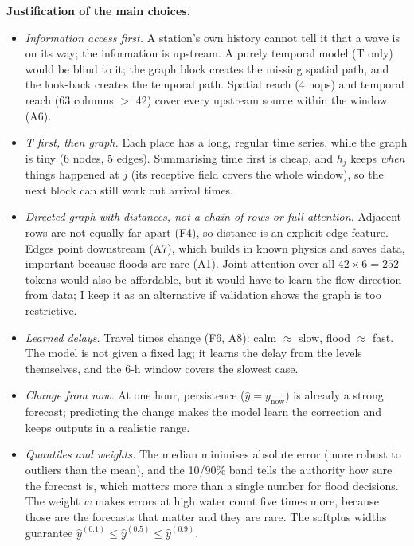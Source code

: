 \textbf{Justification of the main choices.}
\begin{itemize}
\item \emph{Information access first.} A station's own history cannot tell it that a wave is on its way; the information is upstream. A purely temporal model (T only) would be blind to it; the graph block creates the missing spatial path, and the look-back creates the temporal path. Spatial reach (4 hops) and temporal reach (63 columns $>$ 42) cover every upstream source within the window (A6).
\item \emph{T first, then graph.} Each place has a long, regular time series, while the graph is tiny (6 nodes, 5 edges). Summarising time first is cheap, and $h_j$ keeps \emph{when} things happened at $j$ (its receptive field covers the whole window), so the next block can still work out arrival times.
\item \emph{Directed graph with distances, not a chain of rows or full attention.} Adjacent rows are not equally far apart (F4), so distance is an explicit edge feature. Edges point downstream (A7), which builds in known physics and saves data, important because floods are rare (A1). Joint attention over all $42\times6=252$ tokens would also be affordable, but it would have to learn the flow direction from data; I keep it as an alternative if validation shows the graph is too restrictive.
\item \emph{Learned delays.} Travel times change (F6, A8): calm $\approx$ slow, flood $\approx$ fast. The model is not given a fixed lag; it learns the delay from the levels themselves, and the 6-h window covers the slowest case.
\item \emph{Change from now.} At one hour, persistence ($\hat y=y_{\mathrm{now}}$) is already a strong forecast; predicting the change makes the model learn the correction and keeps outputs in a realistic range.
\item \emph{Quantiles and weights.} The median minimises absolute error (more robust to outliers than the mean), and the 10/90\% band tells the authority how sure the forecast is, which matters more than a single number for flood decisions. The weight $w$ makes errors at high water count five times more, because those are the forecasts that matter and they are rare. The softplus widths guarantee $\hat y^{(0.1)}\le\hat y^{(0.5)}\le\hat y^{(0.9)}$.
\end{itemize}

